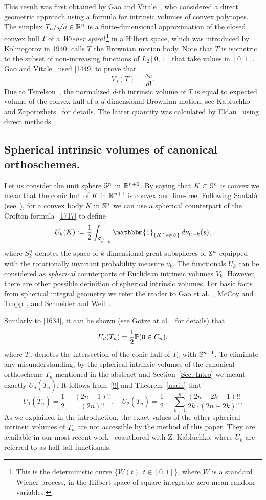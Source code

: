 \documentclass[12pt, reqno]{amsart}
\begin{document}
This result was first obtained by Gao and Vitale~\cite{GV01}, who considered a direct geometric approach using a formula for intrinsic volumes of convex polytopes. The simplex $T_n/\sqrt{n} \in \R^n$ is a finite-dimensional approximation of the closed convex hull $T$ of a {\it Wiener spiral\,}\footnote{This is the deterministic curve $\{ W(t), t \in [0,1] \}$, where $W$ is a standard Wiener process, in the Hilbert space of square-integrable zero mean random variables.} in a Hilbert space, which was introduced by Kolmogorov in 1940; \cite{GV01} calls $T$ the Brownian motion body. Note that $T$ is isometric to the subset of non-increasing functions of $L_2[0,1]$ that take values in $[0,1]$. Gao and Vitale~\cite{GV01} used \eqref{1449} to prove that
$$
V_d(T)=\frac{\kappa_d}{d!}.
$$
Due to Tsirelson~\cite{tsirelson_1, tsirelson_2, tsirelson_3}, the normalized $d$-th intrinsic volume of $T$ is equal to expected volume of the convex hull of a $d$-dimensional Brownian motion, see Kabluchko and Zaporozhets~\cite{KZ14} for details. The latter quantity was calculated by Eldan~\cite{rE14} using direct methods.

\subsection{Spherical intrinsic volumes of canonical orthoschemes.}
Let us consider the unit sphere $\S^n$ in $\R^{n+1}$. By saying that $K \subset \S^n$ is convex we mean that the conic hull of $K$ in $\R^{n+1}$ is convex and line-free. Following Santal\'o (see~\cite[Section~IV.4]{lS76}),  for a convex body $K$ in $\S^n$ we can use a spherical counterpart of the Crofton formula~\eqref{1717} to define
$$
U_k(K):=\frac12\int_{S^n_{n-k}}\mathbbm{1}_{\{K\cap s \neq \varnothing\}} \,d\nu_{n-k}(s),
$$
where $S^n_k$ denotes the space of $k$-dimensional great subspheres of $\S^n$ equipped with the rotationally invariant probability measure $\nu_k$. The functionals $U_k$ can be considered as {\it spherical} counterparts of   Euclidean intrinsic volumes $V_k$. However, there are other possible definition of spherical intrinsic volumes. For basic facts from spherical integral geometry we refer the reader to Gao et al.~\cite{GHS03}, McCoy and Tropp~\cite{MT14}, and Schneider and Weil~\cite[Sec. 6.5]{schneider_weil_book}.

Similarly to \eqref{1634}, it can be shown (see G\"otze at al.~\cite{GKZ15} for details) that
$$
U_d(\tilde T_n)=\frac12\P(0\in C_n),
$$
where $\tilde T_n$ denotes the intersection of the conic hull of $T_n$ with $\S^{n-1}$. To eliminate any misunderstanding, by the spherical intrinsic volumes of the canonical orthoscheme $T_n$ mentioned in the abstract and Section~\ref{Sec: Intro} we meant exactly $U_d(\tilde T_n)$. It follows from~\eqref{!!} and Theorem~\ref{main} that
$$
U_1(\tilde T_n)=\frac12-\frac{(2n-1)!!}{(2n)!!},\quad U_2(\tilde T_n)=\frac12-\sum_{k=1}^n \frac{(2n-2k-1)!!}{2k \cdot (2n-2k)!!}.
$$
As we explained in the introduction, the exact values  of the other spherical intrinsic volumes of $\tilde T_n$ are not accessible by the method of this paper. They are available in our most recent  work~\cite{KVZ15} coauthored with Z. Kabluchko, where $U_k$ are referred to as half-tail functionals. 
\end{document}
